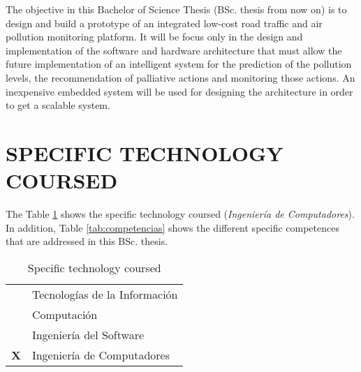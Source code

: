 \documentclass{pre-tfg}
\begin{document}
The objective in this Bachelor of Science Thesis (BSc. thesis from now on) is to design and build a prototype of an integrated low-cost road traffic and air pollution monitoring platform. It will be focus only in the design and implementation of the software and hardware architecture that must allow the future implementation of an intelligent system for the prediction of the pollution levels, the recommendation of palliative actions and monitoring those actions. An inexpensive embedded system will be used for designing the architecture in order to get a scalable system.



\section{SPECIFIC TECHNOLOGY COURSED}

The Table \ref{tab:tec-especifica} shows the specific technology coursed (\emph{Ingeniería de Computadores}). In addition, Table \ref{tab:competencias} shows the different specific competences that are addressed in this BSc. thesis. 

\begin{table}[hp]
	\centering
	\caption{Specific technology coursed}
	\label{tab:tec-especifica}
	
	\begin{tabular}{cp{}}
		\hline
		&Tecnologías de la Información \\
		&Computación \\
		&Ingeniería del Software \\
		\textbf{X}&Ingeniería de Computadores \\
		\hline
	\end{tabular}
\end{table}
\end{document}
